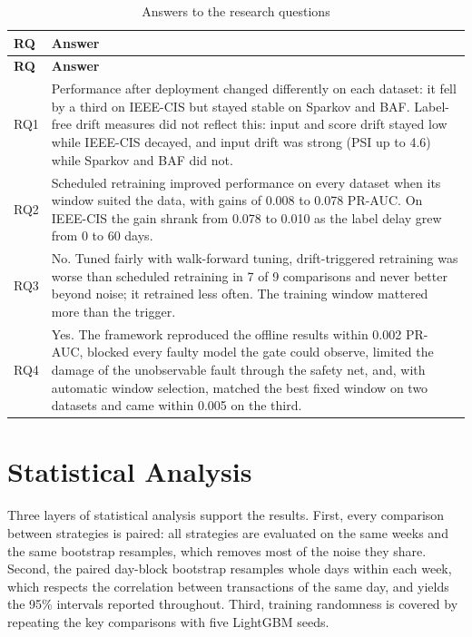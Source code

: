 {\footnotesize
\begin{longtable}{>{\raggedright\arraybackslash}p{}>{\raggedright\arraybackslash}p{}}
\caption{Answers to the research questions}\label{tab:answers}\\
\toprule
\textbf{RQ} & \textbf{Answer} \\
\midrule
\endfirsthead
\toprule
\textbf{RQ} & \textbf{Answer} \\
\midrule
\endhead
RQ1 & Performance after deployment changed differently on each dataset: it fell by a third on IEEE-CIS but stayed stable on Sparkov and BAF. Label-free drift measures did not reflect this: input and score drift stayed low while IEEE-CIS decayed, and input drift was strong (PSI up to 4.6) while Sparkov and BAF did not. \\ \midrule
RQ2 & Scheduled retraining improved performance on every dataset when its window suited the data, with gains of 0.008 to 0.078 PR-AUC. On IEEE-CIS the gain shrank from 0.078 to 0.010 as the label delay grew from 0 to 60 days. \\ \midrule
RQ3 & No. Tuned fairly with walk-forward tuning, drift-triggered retraining was worse than scheduled retraining in 7 of 9 comparisons and never better beyond noise; it retrained less often. The training window mattered more than the trigger. \\ \midrule
RQ4 & Yes. The framework reproduced the offline results within 0.002 PR-AUC, blocked every faulty model the gate could observe, limited the damage of the unobservable fault through the safety net, and, with automatic window selection, matched the best fixed window on two datasets and came within 0.005 on the third. \\ \bottomrule
\end{longtable}
}

\section{Statistical Analysis}\label{sec:statistics}

Three layers of statistical analysis support the results. First, every comparison between strategies is paired: all strategies are evaluated on the same weeks and the same bootstrap resamples, which removes most of the noise they share. Second, the paired day-block bootstrap resamples whole days within each week, which respects the correlation between transactions of the same day, and yields the 95\% intervals reported throughout. Third, training randomness is covered by repeating the key comparisons with five LightGBM seeds.

